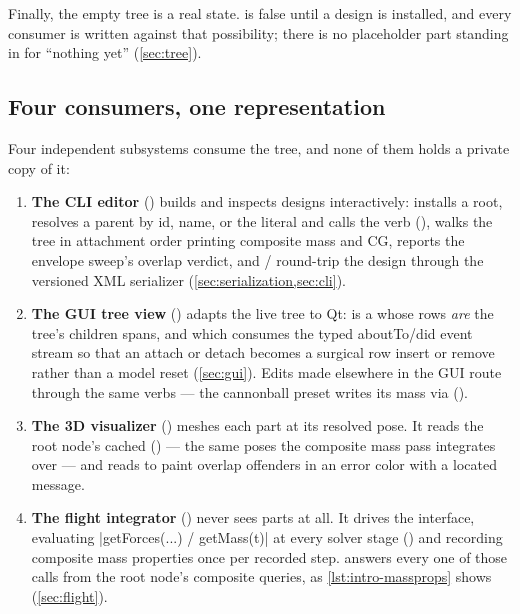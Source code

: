 Finally, the empty tree is a real state.  is false until a design is
installed, and every consumer is written against that possibility; there is no placeholder part
standing in for ``nothing yet'' (\cref{sec:tree}).

\subsection{Four consumers, one representation}\label{sec:intro-consumers}

Four independent subsystems consume the tree, and none of them holds a private copy of it:

\begin{enumerate}
\item \textbf{The CLI editor} () builds and inspects designs interactively:
   installs a root,  resolves a parent by id, name, or the literal
   and calls the  verb (),  walks
  the tree in attachment order printing composite mass and CG,  reports the
  envelope sweep's overlap verdict, and / round-trip the design through
  the versioned XML serializer (\cref{sec:serialization,sec:cli}).
\item \textbf{The GUI tree view} () adapts the live tree to Qt:
   is a  whose rows \emph{are} the tree's children
  spans, and which consumes the typed aboutTo/did event stream so that an attach or detach becomes
  a surgical row insert or remove rather than a model reset (\cref{sec:gui}). Edits made elsewhere
  in the GUI route through the same verbs --- the cannonball preset writes its mass via
   ().
\item \textbf{The 3D visualizer} () meshes each part at its
  resolved pose. It reads the root node's cached 
  () --- the same poses the composite mass pass integrates
  over --- and reads  to paint overlap offenders in an error color
  with a located message.
\item \textbf{The flight integrator} () never sees parts at all. It
  drives the  interface, evaluating
  \cppinline|getForces(...) / getMass(t)| at every solver stage
  () and recording composite mass properties once per recorded
  step.  answers every one of those calls from the root node's composite
  queries, as \cref{lst:intro-massprops} shows (\cref{sec:flight}).
\end{enumerate}

